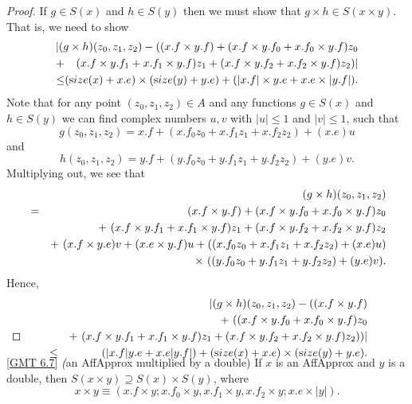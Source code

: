 {\begin{proof}{}  If $g \in S(x)$ and $h \in S(y)$ then we must show that $g\times h \in S(x \times y).$  That is, we need to show
\begin{eqnarray*}
&&\hskip-.25in |(g \times h)(z_0,z_1,z_2)   - 
((x.f \times y.f) + 
(x.f \times y.f_0 + x.f_0 \times y.f) z_0 \\
&\hskip-8pt+\hskip-8pt& (x.f \times y.f_1 + x.f_1 \times y.f) z_1 + (x.f \times y.f_2 + x.f_2 \times y.f) z_2)| 
\\
\le&\hskip-8pt\hskip-8pt&\hskip-16pt ({\textrm size}(x) + x.e) \times ({\textrm size}(y) + y.e) + (|x.f| \times y.e + x.e \times |y.f|).
\end{eqnarray*}
Note that for any point $(z_0, z_1, z_2) \in A$ and any functions $g \in S(x)$ and $h \in S(y)$ we can find complex numbers $u, v$ with
$|u| \le 1$ and $|v| \le 1$, such that
$$ g(z_0, z_1, z_2) = x.f + (x.f_0 z_0 + x.f_1 z_1 + x.f_2 z_2) + (x.e) u$$ and 
$$ h(z_0, z_1, z_2) = y.f + (y.f_0 z_0 + y.f_1 z_1 + y.f_2 z_2) + (y.e) v.$$
Multiplying out, we see that 
\begin{eqnarray*}
&&\hskip-36pt(g \times h) (z_0, z_1, z_2)\\
& = &
(x.f \times y.f) + 
(x.f \times y.f_0 + x.f_0 \times y.f) z_0\\
&& +\ (x.f \times y.f_1 + x.f_1 \times y.f) z_1 +
(x.f \times y.f_2 + x.f_2 \times y.f) z_2\\&& + \
(x.f \times y.e) v + (x.e \times y.f) u + 
((x.f_0 z_0 + x.f_1 z_1 + x.f_2 z_2) + (x.e) u)\\
&& \times\
((y.f_0 z_0 + y.f_1 z_1 + y.f_2 z_2) + (y.e) v).
                                              \end{eqnarray*}
Hence,
\begin{eqnarray*}
&&\hskip-48pt |(g \times h) (z_0, z_1, z_2) - ((x.f \times y.f) \\
& & + \
((x.f \times y.f_0 + x.f_0 \times y.f) z_0\\
&& +\ (x.f \times y.f_1 + x.f_1 \times y.f) z_1 +
(x.f \times y.f_2 + x.f_2 \times y.f) z_2))|
 \\
&\le& (|x.f| y.e + x.e |y.f|) + 
({\textrm size}(x) + x.e) \times ({\textrm size}(y) + y.e).\\
\noalign{\vskip-36pt}
\end{eqnarray*}
\end{proof}

\begin{proposition}{\ref{GMT 6.7} {\textit (an AffApprox multiplied by a double)}}
If $x$ is an {\textrm AffApprox}  and $y$ is a double{\textrm ,} then $S(x \times y) \supseteq S(x) \times S(y)${\textrm ,} where
$$ x \times y \equiv (x.f \times y;  x.f_0 \times y, 
x.f_1 \times y,  x.f_2 \times y; 
x.e \times |y|). $$
\end{proposition}

}
